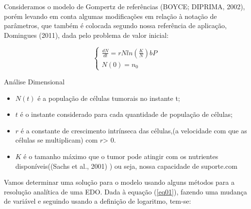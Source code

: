 Consideramos o modelo de Gompertz de referências (BOYCE; DIPRIMA, 2002), porém levando em conta algumas modificações em relação à notação de parâmetros, que também é colocada segundo nossa referência de aplicação, Domingues (2011), dada pelo problema de valor inicial:

   \begin{equation*}
\begin{cases}
  \frac{dN}{dt} =rNln(\frac{K}{N}) 
   bP\\
   N(0)=n_0  
\end{cases}
\end{equation*}

Análise Dimensional
\begin{itemize}
    \item $N(t)$ é a população de células tumorais no instante t;
    \item $t$ é o instante considerado para cada quantidade de população de células;
    \item $r$ é a constante de crescimento intrínseca das células,(a velocidade com  que as células se multiplicam) com $r$> 0.

    \item $K$ é o tamanho máximo que o tumor pode atingir com os nutrientes disponíveis((Sachs et al., 2001)
) ou seja, nossa capacidade de suporte.com 

\end{itemize}
  Vamos determinar uma solução para o modelo usando alguns métodos para a resolução analítica de uma EDO. Dada à equação (\ref{eq01}), fazendo uma mudança de variável e seguindo usando a definição de logaritmo, tem-se:
  
